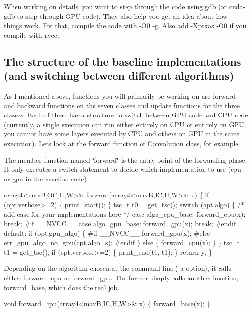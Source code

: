 When working on details, you want to step through the code using gdb (or cuda-\/gdb to step through G\+PU code). They also help you get an idea about how things work. For that, compile the code with -\/\+O0 -\/g. Also add -\/\+Xptxas -\/\+O0 if you compile with nvcc.

\subsection*{The structure of the baseline implementations (and switching between different algorithms) }

As I mentioned above, functions you will primarily be working on are forward and backward functions on the seven classes and update functions for the three classes. Each of them has a structure to switch between G\+PU code and C\+PU code (currently, a single execution can run either entirely on C\+PU or entirely on G\+PU; you cannot have some layers executed by C\+PU and others on G\+PU in the same execution). Let\textquotesingle{}s look at the forward function of Convolution class, for example.

The member function named \char`\"{}forward\char`\"{} is the entry point of the forwarding phase. It only executes a switch statement to decide which implementation to use (cpu or gpu in the baseline code).


\begin{DoxyCode}
  array4<maxB,OC,H,W>& forward(array4<maxB,IC,H,W>& x) \{
    if (opt.verbose>=2) \{ print\_start(); \}
    tsc\_t t0 = get\_tsc();
    switch (opt.algo) \{
      /* add case for your implementations here */
    case algo\_cpu\_base:
      forward\_cpu(x); break;
#if \_\_NVCC\_\_
    case algo\_gpu\_base:
      forward\_gpu(x); break;
#endif
    default:
      if (opt.gpu\_algo) \{
#if \_\_NVCC\_\_
        forward\_gpu(x);
#else
        err\_gpu\_algo\_no\_gpu(opt.algo\_s);
#endif
      \} else \{
        forward\_cpu(x);
      \}        
    \}
    tsc\_t t1 = get\_tsc();
    if (opt.verbose>=2) \{ print\_end(t0, t1); \}
    return y;
  \}
\end{DoxyCode}


Depending on the algorithm chosen at the command line (-\/a option), it calls either forward\+\_\+cpu or forward\+\_\+gpu. The former simply calls another function, forward\+\_\+base, which does the real job.


\begin{DoxyCode}
void forward\_cpu(array4<maxB,IC,H,W>& x) \{
  forward\_base(x);
\}
\end{DoxyCode}



